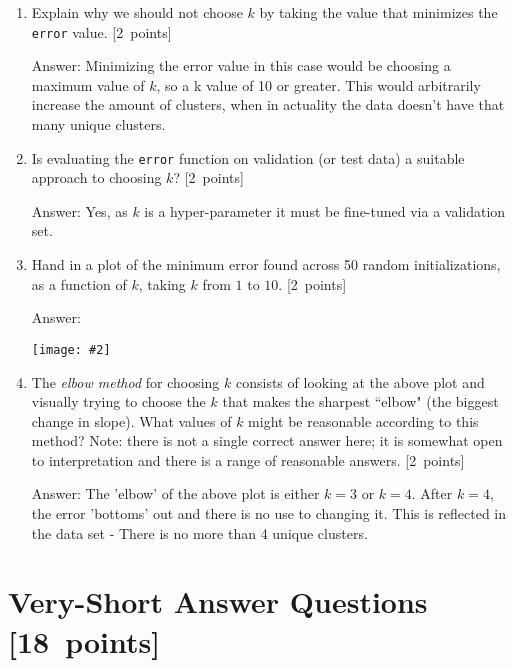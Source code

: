 \documentclass{article}
\newcommand{\blu}[1]{{\textcolor{blu}{#1}}}
\newenvironment{answer}{\par\begingroup\color{gre}Answer: }{\endgroup}
\let\ask\blu
\newcommand\pts[1]{\textcolor{pointscolour}{[#1~points]}}
\newcommand{\centerfig}[2]{\begin{center}\texttt{[image: \#2]}\end{center}}
\begin{document}
    \begin{enumerate}
        \item \ask{Explain why we should not choose $k$ by taking the value that minimizes the \texttt{error} value.} \pts{2}
        \begin{answer}
        Minimizing the error value in this case would be choosing a maximum value of $k$, so a k value of 10 or greater. This would arbitrarily increase the amount of clusters, when in actuality the data doesn't have that many unique clusters. 
        \end{answer}
        \item \ask{Is evaluating the \texttt{error} function on validation (or test data) a suitable approach to choosing $k$?} \pts{2}
        \begin{answer}
        Yes, as $k$ is a hyper-parameter it must be fine-tuned via a validation set.
        \end{answer}
        \item \ask{Hand in a plot of the minimum error found across 50 random initializations, as a function of $k$, taking $k$ from $1$ to $10$.} \pts{2}
        \begin{answer}
        \centerfig{.5}{figs/kmeans_5_2_lowest_error.png}
        \end{answer}
        \item The \emph{elbow method} for choosing $k$ consists of looking at the above plot and visually trying to choose the $k$ that makes the sharpest ``elbow" (the biggest change in slope). \ask{What values of $k$ might be reasonable according to this method?} Note: there is not a single correct answer here; it is somewhat open to interpretation and there is a range of reasonable answers. \pts{2}
        \begin{answer}
        The 'elbow' of the above plot is either $k = 3$ or $k = 4$. After $k = 4$, the error 'bottoms' out and there is no use to changing it. This is reflected in the data set - There is no more than 4 unique clusters.
        \end{answer}
    \end{enumerate}

    \clearpage
    \section{Very-Short Answer Questions \pts{18}}
\end{document}
